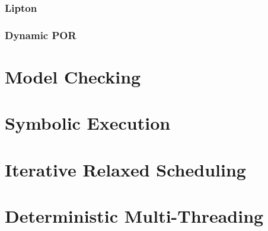 \subsubsection{Lipton}
\subsubsection{Dynamic POR}

\section{Model Checking}
\section{Symbolic Execution}

\section{Iterative Relaxed Scheduling}
\section{Deterministic Multi-Threading}
